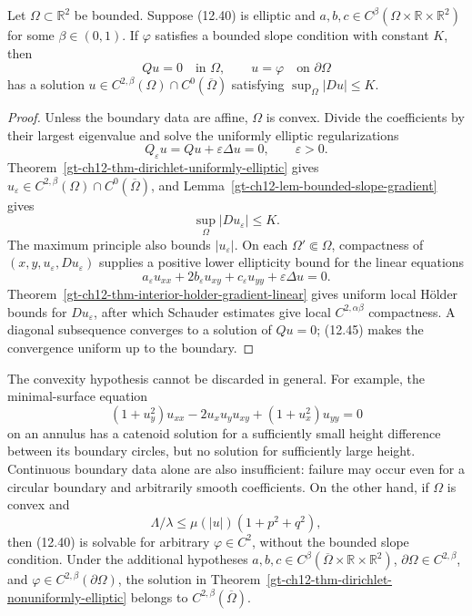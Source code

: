 \begin{theorem}
\label{gt-ch12-thm-dirichlet-nonuniformly-elliptic}
Let $\Omega\subset\mathbb R^2$ be bounded.  Suppose (12.40) is elliptic and
$a,b,c\in C^\beta(\Omega\times\mathbb R\times\mathbb R^2)$ for some
$\beta\in(0,1)$.  If $\varphi$ satisfies a bounded slope condition with
constant $K$, then
\[
Qu=0\quad\text{in }\Omega,
\qquad u=\varphi\quad\text{on }\partial\Omega
\]
has a solution
$u\in C^{2,\beta}(\Omega)\cap C^0(\overline\Omega)$ satisfying
$\sup_\Omega|Du|\le K$.
\end{theorem}
\begin{proof}
\sketch Unless the boundary data are affine, $\Omega$ is convex.  Divide
the coefficients by their largest eigenvalue and solve the uniformly
elliptic regularizations
\begin{equation}\tag{12.44}
Q_\varepsilon u=Qu+\varepsilon\Delta u=0,
\qquad \varepsilon>0.
\end{equation}
Theorem~\ref{gt-ch12-thm-dirichlet-uniformly-elliptic} gives
$u_\varepsilon\in C^{2,\beta}(\Omega)\cap C^0(\overline\Omega)$, and
Lemma~\ref{gt-ch12-lem-bounded-slope-gradient} gives
\begin{equation}\tag{12.45}
\sup_\Omega|Du_\varepsilon|\le K.
\end{equation}
The maximum principle also bounds $|u_\varepsilon|$.  On each
$\Omega'\Subset\Omega$, compactness of
$(x,y,u_\varepsilon,Du_\varepsilon)$ supplies a positive lower ellipticity
bound for the linear equations
\begin{equation}\tag{12.46}
a_\varepsilon u_{xx}
+2b_\varepsilon u_{xy}
+c_\varepsilon u_{yy}
+\varepsilon\Delta u=0.
\end{equation}
Theorem~\ref{gt-ch12-thm-interior-holder-gradient-linear} gives uniform
local H\"older bounds for $Du_\varepsilon$, after which Schauder estimates
give local $C^{2,\alpha\beta}$ compactness.  A diagonal subsequence converges
to a solution of $Qu=0$; (12.45) makes the convergence uniform up to the
boundary.
\end{proof}

The convexity hypothesis cannot be discarded in general.  For example, the
minimal-surface equation
\begin{equation}\tag{12.47}
(1+u_y^2)u_{xx}-2u_xu_yu_{xy}+(1+u_x^2)u_{yy}=0
\end{equation}
on an annulus has a catenoid solution for a sufficiently small height
difference between its boundary circles, but no solution for sufficiently
large height.  Continuous boundary data alone are also insufficient: failure
may occur even for a circular boundary and arbitrarily smooth coefficients.
On the other hand, if $\Omega$ is convex and
\[
\Lambda/\lambda\le\mu(|u|)(1+p^2+q^2),
\]
then (12.40) is solvable for arbitrary $\varphi\in C^2$, without the bounded
slope condition.  Under the additional hypotheses
$a,b,c\in C^\beta(\overline\Omega\times\mathbb R\times\mathbb R^2)$,
$\partial\Omega\in C^{2,\beta}$, and
$\varphi\in C^{2,\beta}(\partial\Omega)$, the solution in
Theorem~\ref{gt-ch12-thm-dirichlet-nonuniformly-elliptic} belongs to
$C^{2,\beta}(\overline\Omega)$.

